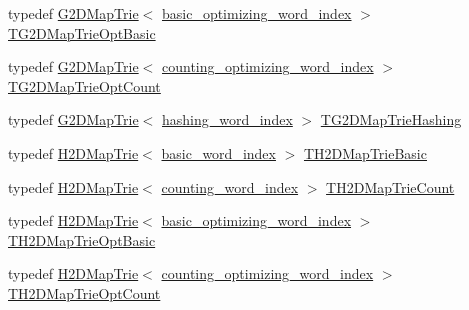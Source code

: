 \begin{DoxyCompactItemize}
\item 
typedef \hyperlink{classuva_1_1smt_1_1bpbd_1_1server_1_1lm_1_1_g2_d_map_trie}{G2\+D\+Map\+Trie}$<$ \hyperlink{namespaceuva_1_1smt_1_1bpbd_1_1server_1_1lm_1_1dictionary_a3001583c904eec702b4a4125082a7ecd}{basic\+\_\+optimizing\+\_\+word\+\_\+index} $>$ \hyperlink{namespaceuva_1_1smt_1_1bpbd_1_1server_1_1lm_a7e7e59c4bbfb156cb0d74a38a0cd7acf}{T\+G2\+D\+Map\+Trie\+Opt\+Basic}
\item 
typedef \hyperlink{classuva_1_1smt_1_1bpbd_1_1server_1_1lm_1_1_g2_d_map_trie}{G2\+D\+Map\+Trie}$<$ \hyperlink{namespaceuva_1_1smt_1_1bpbd_1_1server_1_1lm_1_1dictionary_a61cbd647b15de785ccf4cdd26661c366}{counting\+\_\+optimizing\+\_\+word\+\_\+index} $>$ \hyperlink{namespaceuva_1_1smt_1_1bpbd_1_1server_1_1lm_a4bb2485b784ec0eeb9700beaacee3b67}{T\+G2\+D\+Map\+Trie\+Opt\+Count}
\item 
typedef \hyperlink{classuva_1_1smt_1_1bpbd_1_1server_1_1lm_1_1_g2_d_map_trie}{G2\+D\+Map\+Trie}$<$ \hyperlink{classuva_1_1smt_1_1bpbd_1_1server_1_1lm_1_1dictionary_1_1hashing__word__index}{hashing\+\_\+word\+\_\+index} $>$ \hyperlink{namespaceuva_1_1smt_1_1bpbd_1_1server_1_1lm_a3b5d2fae05ef641d6c84be4ca79062eb}{T\+G2\+D\+Map\+Trie\+Hashing}
\item 
typedef \hyperlink{classuva_1_1smt_1_1bpbd_1_1server_1_1lm_1_1_h2_d_map_trie}{H2\+D\+Map\+Trie}$<$ \hyperlink{classuva_1_1smt_1_1bpbd_1_1server_1_1lm_1_1dictionary_1_1basic__word__index}{basic\+\_\+word\+\_\+index} $>$ \hyperlink{namespaceuva_1_1smt_1_1bpbd_1_1server_1_1lm_a9c09db165d8f78b5bd1ed3925f7cdf37}{T\+H2\+D\+Map\+Trie\+Basic}
\item 
typedef \hyperlink{classuva_1_1smt_1_1bpbd_1_1server_1_1lm_1_1_h2_d_map_trie}{H2\+D\+Map\+Trie}$<$ \hyperlink{classuva_1_1smt_1_1bpbd_1_1server_1_1lm_1_1dictionary_1_1counting__word__index}{counting\+\_\+word\+\_\+index} $>$ \hyperlink{namespaceuva_1_1smt_1_1bpbd_1_1server_1_1lm_ad15ed56267177261838deb012dd84484}{T\+H2\+D\+Map\+Trie\+Count}
\item 
typedef \hyperlink{classuva_1_1smt_1_1bpbd_1_1server_1_1lm_1_1_h2_d_map_trie}{H2\+D\+Map\+Trie}$<$ \hyperlink{namespaceuva_1_1smt_1_1bpbd_1_1server_1_1lm_1_1dictionary_a3001583c904eec702b4a4125082a7ecd}{basic\+\_\+optimizing\+\_\+word\+\_\+index} $>$ \hyperlink{namespaceuva_1_1smt_1_1bpbd_1_1server_1_1lm_aaad3c59cbddee8695a5b1468ac1be102}{T\+H2\+D\+Map\+Trie\+Opt\+Basic}
\item 
typedef \hyperlink{classuva_1_1smt_1_1bpbd_1_1server_1_1lm_1_1_h2_d_map_trie}{H2\+D\+Map\+Trie}$<$ \hyperlink{namespaceuva_1_1smt_1_1bpbd_1_1server_1_1lm_1_1dictionary_a61cbd647b15de785ccf4cdd26661c366}{counting\+\_\+optimizing\+\_\+word\+\_\+index} $>$ \hyperlink{namespaceuva_1_1smt_1_1bpbd_1_1server_1_1lm_a3d797c5f90202da4ebb0616a2d9fc188}{T\+H2\+D\+Map\+Trie\+Opt\+Count}

\end{DoxyCompactItemize}
